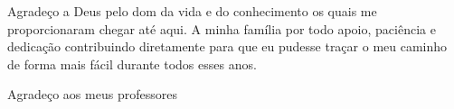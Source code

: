 
\begin{agradecimentos}[AGRADECIMENTOS]

Agradeço a Deus pelo dom da vida e do conhecimento os quais me proporcionaram chegar até aqui. A minha família por todo apoio, paciência e dedicação contribuindo diretamente para que eu pudesse traçar o meu caminho de forma mais fácil durante todos esses anos.

Agradeço aos meus professores

\end{agradecimentos}
